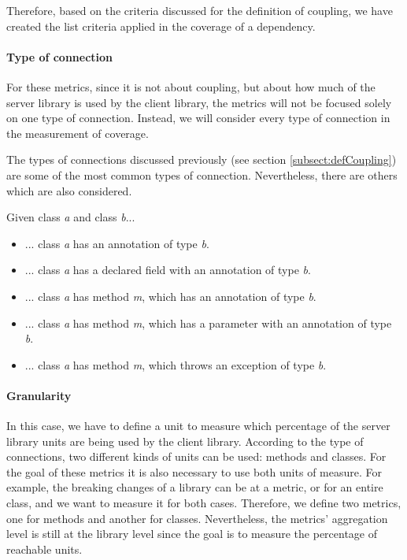 Therefore, based on the criteria discussed for the definition of coupling, we have created the list criteria applied in the coverage of a dependency.

\paragraph{Type of connection}
For these metrics, since it is not about coupling, but about how much of the server library is used by the client library, the metrics will not be focused solely on one type of connection. Instead, we will consider every type of connection in the measurement of coverage.

The types of connections discussed previously (see section \ref{subsect:defCoupling}) are some of the most common types of connection. Nevertheless, there are others which are also considered.

Given class \textit{a} and class \textit{b}...

\begin{itemize}
  \item ... class \textit{a} has an annotation of type \textit{b}.
  \item ... class \textit{a} has a declared field with an annotation of type \textit{b}.
  \item ... class \textit{a} has method \textit{m}, which has an annotation of type \textit{b}.
  \item ... class \textit{a} has method \textit{m}, which has a parameter with an annotation of type \textit{b}.
  \item ... class \textit{a} has method \textit{m}, which throws an exception of type \textit{b}.
\end{itemize}

\paragraph{Granularity}
In this case, we have to define a unit to measure which percentage of the server library units are being used by the client library. According to the type of connections, two different kinds of units can be used: methods and classes. For the goal of these metrics it is also necessary to use both units of measure. For example, the breaking changes of a library can be at a metric, or for an entire class, and we want to measure it for both cases. Therefore, we define two metrics, one for methods and another for classes. Nevertheless, the metrics' aggregation level is still at the library level since the goal is to measure the percentage of reachable units.

